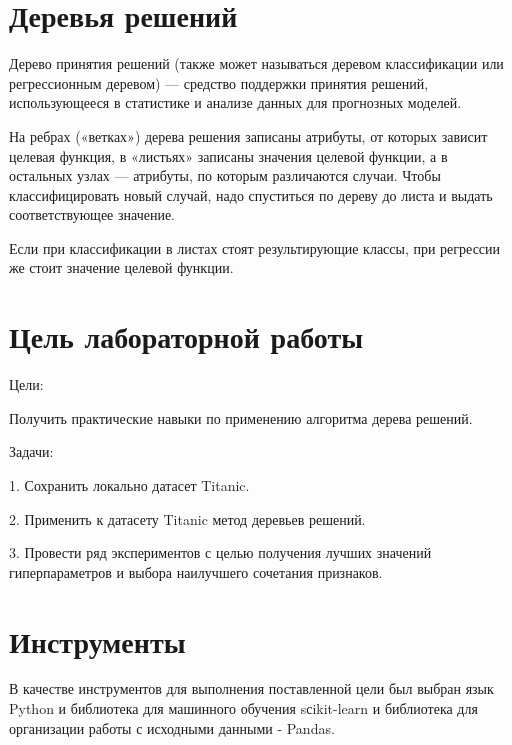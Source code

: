 \documentclass[a4paper,12pt]{article}
\begin{document}
\begin{titlepage}
\newpage

\end{titlepage}

\newpage
\tableofcontents
\setcounter{page}{2}


\newpage\section{Деревья решений} 
	Дерево принятия решений (также может называться деревом классификации или регрессионным деревом) — средство поддержки принятия решений, использующееся в статистике и анализе данных для прогнозных моделей. 
	
	\vspace{0.5cm}
	На ребрах («ветках») дерева решения записаны атрибуты, от которых зависит целевая функция, в «листьях» записаны значения целевой функции, а в остальных узлах — атрибуты, по которым различаются случаи. Чтобы классифицировать новый случай, надо спуститься по дереву до листа и выдать соответствующее значение. 
	
	\vspace{0.5cm}
	Если при классификации в листах стоят результирующие классы, при регрессии же стоит значение целевой функции.
	
	
	
\newpage\section{Цель лабораторной работы} 
	Цели: 
	\vspace{0.5cm}
	
	Получить практические навыки по применению алгоритма дерева решений.
	
	\vspace{0.1cm}
	Задачи: 
	
	\vspace{0.1cm}
	1. Сохранить локально датасет Titanic.
	
	\vspace{0.1cm}
	2. Применить к датасету Titanic метод деревьев решений.
	
	\vspace{0.1cm}
	3. Провести ряд экспериментов с целью получения лучших значений гиперпараметров и выбора наилучшего сочетания признаков.
	
\newpage\section{Инструменты} 
	В качестве инструментов для выполнения поставленной цели был выбран язык Python и библиотека для машинного обучения sсikit-learn и библиотека для организации работы с исходными данными - Pandas.
	
\end{document}
